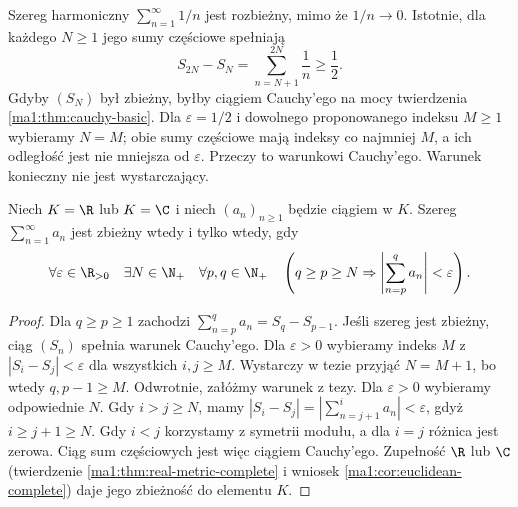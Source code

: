 \begin{przyklad}
\label{ma1:ex:harmonic-series}
Szereg harmoniczny $\sum_{n=1}^\infty 1/n$ jest rozbieżny, mimo że $1/n\to0$. Istotnie, dla każdego $N\ge1$ jego sumy częściowe spełniają
\[
 S_{2N}-S_N=\sum_{n=N+1}^{2N}\frac1n\ge\frac12.
\]
Gdyby $(S_N)$ był zbieżny, byłby ciągiem Cauchy'ego na mocy twierdzenia \ref{ma1:thm:cauchy-basic}. Dla $\varepsilon=1/2$ i dowolnego proponowanego indeksu $M\ge1$ wybieramy $N=M$; obie sumy częściowe mają indeksy co najmniej $M$, a ich odległość jest nie mniejsza od $\varepsilon$. Przeczy to warunkowi Cauchy'ego. Warunek konieczny nie jest wystarczający.
\end{przyklad}

\begin{twierdzenie}
\label{ma1:thm:series-cauchy}
Niech $K=\R$ lub $K=\C$ i niech $(a_n)_{n\ge1}$ będzie ciągiem w $K$. Szereg $\sum_{n=1}^\infty a_n$ jest zbieżny wtedy i tylko wtedy, gdy
\[
 \forall\varepsilon\in\R_{>0}\quad\exists N\in\N_+\quad
 \forall p,q\in\N_+\quad
 \left(q\ge p\ge N\Rightarrow
 \left|\sum_{n=p}^{q}a_n\right|<\varepsilon\right).
\]
\end{twierdzenie}
\begin{proof}
Dla $q\ge p\ge1$ zachodzi $\sum_{n=p}^q a_n=S_q-S_{p-1}$. Jeśli szereg jest zbieżny, ciąg $(S_n)$ spełnia warunek Cauchy'ego. Dla $\varepsilon>0$ wybieramy indeks $M$ z $|S_i-S_j|<\varepsilon$ dla wszystkich $i,j\ge M$. Wystarczy w tezie przyjąć $N=M+1$, bo wtedy $q,p-1\ge M$.
Odwrotnie, załóżmy warunek z tezy. Dla $\varepsilon>0$ wybieramy odpowiednie $N$. Gdy $i>j\ge N$, mamy $|S_i-S_j|=|\sum_{n=j+1}^i a_n|<\varepsilon$, gdyż $i\ge j+1\ge N$. Gdy $i<j$ korzystamy z symetrii modułu, a dla $i=j$ różnica jest zerowa. Ciąg sum częściowych jest więc ciągiem Cauchy'ego. Zupełność $\R$ lub $\C$ (twierdzenie \ref{ma1:thm:real-metric-complete} i wniosek \ref{ma1:cor:euclidean-complete}) daje jego zbieżność do elementu $K$.
\end{proof}

